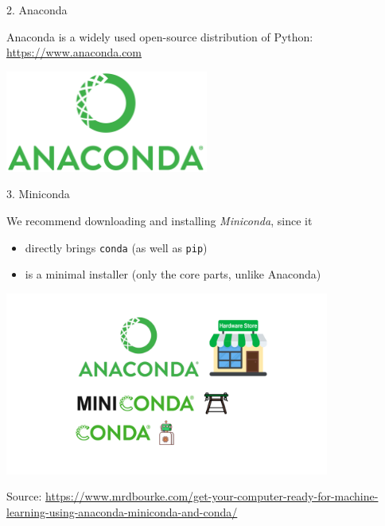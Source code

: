 
\begin{vbframe}{2. Anaconda}

\vfill

Anaconda is a widely used open-source distribution of Python: 
\url{https://www.anaconda.com}

\vspace{.5cm}

\centering
\includegraphics[width=0.5\textwidth]{figure/anaconda.png}

\vfill

\end{vbframe}


\begin{vbframe}{3. Miniconda}

\vfill

We recommend downloading and installing \textit{Miniconda}, since it

\begin{itemize}
	\item directly brings \texttt{conda} (as well as \texttt{pip})
	\item is a minimal installer (only the core parts, unlike Anaconda)
\end{itemize}

\centering
\includegraphics[width=0.8\textwidth]{figure/miniconda.png}

\tiny Source: \url{https://www.mrdbourke.com/get-your-computer-ready-for-machine-learning-using-anaconda-miniconda-and-conda/}

\vfill

\end{vbframe}


